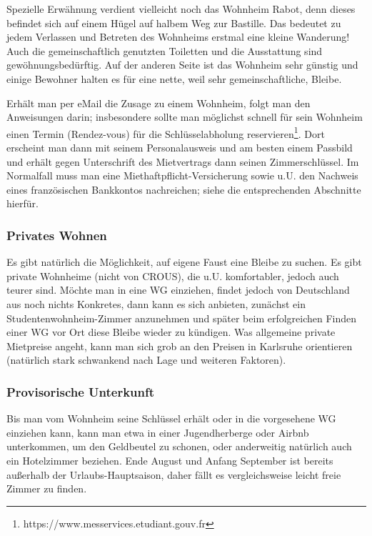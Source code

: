\documentclass[11pt,a4paper]{article}
\begin{document}
	Spezielle Erwähnung verdient vielleicht noch das Wohnheim Rabot, denn dieses befindet sich auf einem Hügel auf halbem Weg zur Bastille. Das bedeutet zu jedem Verlassen und Betreten des Wohnheims erstmal eine kleine Wanderung! Auch die gemeinschaftlich genutzten Toiletten und die Ausstattung sind gewöhnungsbedürftig. Auf der anderen Seite ist das Wohnheim sehr günstig und einige Bewohner halten es für eine nette, weil sehr gemeinschaftliche, Bleibe.
	
	Erhält man per eMail die Zusage zu einem Wohnheim, folgt man den Anweisungen darin; insbesondere sollte man möglichst schnell für sein Wohnheim einen Termin (Rendez-vous) für die Schlüsselabholung reservieren\footnote{https://www.messervices.etudiant.gouv.fr}. Dort erscheint man dann mit seinem Personalausweis und am besten einem Passbild und erhält gegen Unterschrift des Mietvertrags dann seinen Zimmerschlüssel. Im Normalfall muss man eine Miethaftpflicht-Versicherung sowie u.U. den Nachweis eines französischen Bankkontos nachreichen; siehe die entsprechenden Abschnitte hierfür.
	
	\subsubsection{Privates Wohnen}
	
	Es gibt natürlich die Möglichkeit, auf eigene Faust eine Bleibe zu suchen. Es gibt private Wohnheime (nicht von CROUS), die u.U. komfortabler, jedoch auch teurer sind. Möchte man in eine WG einziehen, findet jedoch von Deutschland aus noch nichts Konkretes, dann kann es sich anbieten, zunächst ein Studentenwohnheim-Zimmer anzunehmen und später beim erfolgreichen Finden einer WG vor Ort diese Bleibe wieder zu kündigen. Was allgemeine private Mietpreise angeht, kann man sich grob an den Preisen in Karlsruhe orientieren (natürlich stark schwankend nach Lage und weiteren Faktoren).
	
	\subsubsection{Provisorische Unterkunft}
	
	Bis man vom Wohnheim seine Schlüssel erhält oder in die vorgesehene WG einziehen kann, kann man etwa in einer Jugendherberge oder Airbnb unterkommen, um den Geldbeutel zu schonen, oder anderweitig natürlich auch ein Hotelzimmer beziehen. Ende August und Anfang September ist bereits außerhalb der Urlaubs-Hauptsaison, daher fällt es vergleichsweise leicht freie Zimmer zu finden.
	
\end{document}

